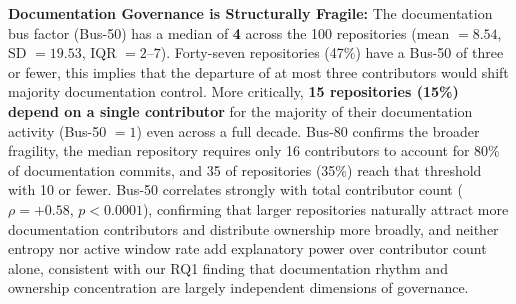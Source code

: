 \documentclass[10pt,conference]{IEEEtran}
\newcommand{\EAdejumo}[1]{\textcolor{red}{{\bfseries [[#1]]}}}
\begin{document}
{{\textbf{Documentation Governance is Structurally Fragile:}
The documentation bus factor (Bus-50) has a median of \textbf{4} across the 100 repositories (mean $= 8.54$, SD $= 19.53$, IQR $= 2$--$7$). Forty-seven repositories (47\%) have a Bus-50 of three or fewer, this implies that the departure of at most three contributors would shift majority
documentation control. More critically, \textbf{15
repositories (15\%) depend on a single contributor} for the majority of their documentation activity (Bus-50 $= 1$) even across a full decade.
Bus-80 confirms the broader fragility, the median repository requires only 16 contributors to account for 80\% of documentation commits,
and 35 of repositories (35\%)  reach that threshold with 10 or fewer. Bus-50 correlates strongly with total contributor count ($\rho = +0.58$, $p < 0.0001$), confirming that larger repositories naturally attract more documentation contributors and distribute ownership more broadly, and neither entropy nor active window rate add explanatory power over contributor count alone, consistent with our RQ1 finding that documentation rhythm and ownership concentration are largely independent dimensions of governance.



}}
\end{document}
